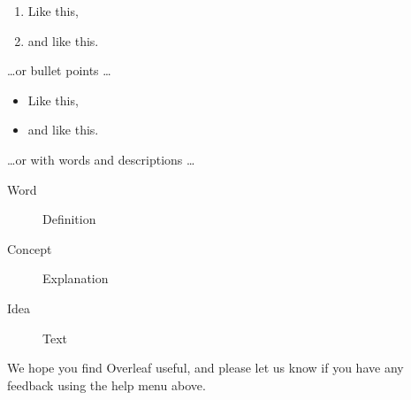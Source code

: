 \documentclass[12pt]{IIBproject}
\begin{document}
\begin{enumerate}
\item Like this,
\item and like this.
\end{enumerate}
\dots or bullet points \dots
\begin{itemize}
\item Like this,
\item and like this.
\end{itemize}
\dots or with words and descriptions \dots
\begin{description}
\item[Word] Definition
\item[Concept] Explanation
\item[Idea] Text
\end{description}

We hope you find Overleaf useful, and please let us know if you have any feedback using the help menu above.
\end{document}
